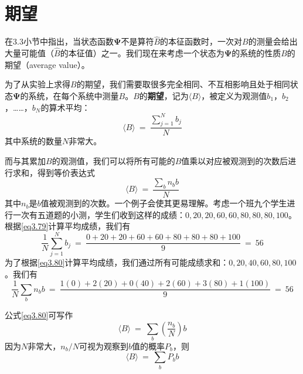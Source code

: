 \documentclass[12pt,a4paper,openany]{ctexbook}
\begin{document}
\section{期望}
\begin{flushleft}
    \setlength{\parindent}{2em}
在3.3小节中指出，当状态函数$\bm{\Psi}$不是算符$\hat{B}$的本征函数时，一次对$B$的测量会给出大量可能值（$\hat{B}$的本征值）之一。我们现在来考虑一个状态为$\bm{\Psi}$的系统的性质$B$的期望（average value）。

为了从实验上求得$B$的期望，我们需要取很多完全相同、不互相影响且处于相同状态$\bm{\Psi}$的系统，在每个系统中测量$B$。$B$的\textbf{期望}，记为$\langle B\rangle$，被定义为观测值$b_1$，$b_2$，……，$b_N$的算术平均：
\begin{equation}
    \langle B\rangle\ =\ \frac{\sum_{j=1}^Nb_j}{N} \label{eq3.79}
\end{equation}
其中系统的数量$N$非常大。

而与其累加$B$的观测值，我们可以将所有可能的$B$值乘以对应被观测到的次数后进行求和，得到等价表达式
\begin{equation}
    \langle B\rangle\ =\ \frac{\sum_b n_bb}{N} \label{eq3.80}
\end{equation}
其中$n_b$是$b$值被观测到的次数。一个例子会使其更易理解。考虑一个班九个学生进行一次有五道题的小测，学生们收到这样的成绩：$0, 20, 20, 60, 60, 80, 80, 80, 100$。根据\eqref{eq3.79}计算平均成绩，我们有
\begin{equation*}
    \frac{1}{N}\sum_{j=1}^Nb_j\ =\ \frac{0+20+20+60+60+80+80+80+100}{9}\ =\ 56
\end{equation*}
为了根据\eqref{eq3.80}计算平均成绩，我们通过所有可能成绩求和：$0,20,40,60,80,100$。我们有
\begin{equation*}
    \frac{1}{N}\sum_bn_bb\ =\ \frac{1(0)+2(20)+0(40)+2(60)+3(80)+1(100)}{9}\ =\ 56
\end{equation*}

公式\eqref{eq3.80}可写作
\begin{equation*}
    \langle B\rangle\ =\ \sum_b(\frac{n_b}{N})b
\end{equation*}
因为$N$非常大，$n_b/N$可视为观察到$b$值的概率$P_b$，则
\begin{equation}
    \langle B\rangle\ =\ \sum_bP_bb \label{eq3.81}
\end{equation}


\end{flushleft}
\end{document}
